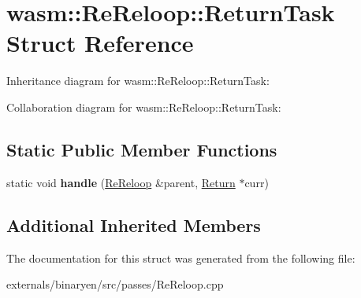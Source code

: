 \hypertarget{structwasm_1_1_re_reloop_1_1_return_task}{}\section{wasm\+:\+:Re\+Reloop\+:\+:Return\+Task Struct Reference}
\label{structwasm_1_1_re_reloop_1_1_return_task}


Inheritance diagram for wasm\+:\+:Re\+Reloop\+:\+:Return\+Task\+:


Collaboration diagram for wasm\+:\+:Re\+Reloop\+:\+:Return\+Task\+:
\subsection*{Static Public Member Functions}
\begin{DoxyCompactItemize}
\item 
\mbox{\label{structwasm_1_1_re_reloop_1_1_return_task_a02aa79958348a3a52970d90c759a889b}} 
static void {\bfseries handle} (\mbox{\hyperlink{structwasm_1_1_re_reloop}{Re\+Reloop}} \&parent, \mbox{\hyperlink{classwasm_1_1_return}{Return}} $\ast$curr)
\end{DoxyCompactItemize}
\subsection*{Additional Inherited Members}


The documentation for this struct was generated from the following file\+:\begin{DoxyCompactItemize}
\item 
externals/binaryen/src/passes/Re\+Reloop.\+cpp\end{DoxyCompactItemize}
